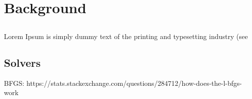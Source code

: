 
\chapter{Background}  %

\ifpdf
    \graphicspath{{Chapter1/Figs/Raster/}{Chapter1/Figs/PDF/}{Chapter1/Figs/}}
\else
    \graphicspath{{Chapter1/Figs/Vector/}{Chapter1/Figs/}}
\fi


\section{} %

Lorem Ipsum is simply dummy text of the printing and typesetting industry (see 

\section{Solvers}

BFGS: https://stats.stackexchange.com/questions/284712/how-does-the-l-bfgs-work
